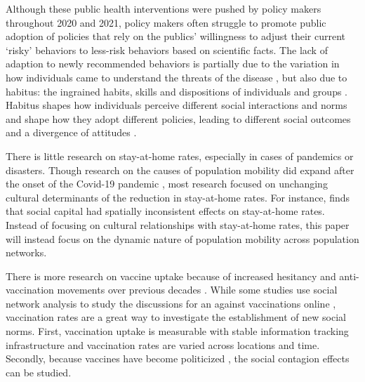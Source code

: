 Although these public health interventions were pushed by policy makers
throughout 2020 and 2021, policy makers often struggle to promote public
adoption of policies that rely on the publics' willingness to adjust their
current `risky' behaviors to less-risk behaviors based on scientific facts. The
lack of adaption to newly recommended behaviors is partially due to the
variation in how individuals came to understand the threats of the disease
\citep{akpanAssociationWhatPeople2021, bailey_etal20}, but also due to habitus: the
ingrained habits, skills and dispositions of individuals and groups
\citep{bourdieu77}. Habitus shapes how individuals perceive different social
interactions and norms and shape how they adopt different policies, leading to
different social outcomes and a divergence of attitudes \citep{scottarthur_etal21, williams95, madeira_etal18}.

There is little research on stay-at-home rates, especially in cases of pandemics
or disasters. Though research on the causes of population mobility did expand
after the onset of the Covid-19 pandemic 
\citep{bargainTrustCompliancePublic2020, bourassaStatelevelStayathomeOrders2020, bourassaSocialDistancingHealth2020, grossmanPoliticalPartisanshipInfluences2020, haggerPredictingSocialDistancing2020, hillBloodChristCompels2020, hillNastiestQuestion, hillLoveThyAged2021,huynhDoesCultureMatter2020}, most research focused on unchanging cultural
determinants of the reduction in stay-at-home rates. For instance, \citet{gibbons_etal21}
 finds that social capital had spatially inconsistent effects on
stay-at-home rates. Instead of focusing on cultural relationships with
stay-at-home rates, this paper will instead focus on the dynamic nature of
population mobility across population networks.

There is more research on vaccine uptake \citep{schmidBarriersInfluenzaVaccination2017}
 because of increased hesitancy and
anti-vaccination movements over previous decades \citep{baumgaertnerInfluencePoliticalIdeology2018, hornseyDonaldTrumpVaccination2020, johnsonOnlineCompetitionPro2020, whiteheadHowCultureWars2020}. While some studies use social network analysis to
study the discussions for an against vaccinations online \citep{milaniVisualVaccineDebate2020}, vaccination rates are a great way to
investigate the establishment of new social norms. First, vaccination uptake is
measurable with stable information tracking infrastructure and vaccination
rates are varied across locations and time. Secondly, because vaccines have 
become politicized \citep{mottaRepublicansNotDemocrats2021, mottaIdentifyingPrevalenceCorrelates2021}, the social contagion effects can be
studied.

